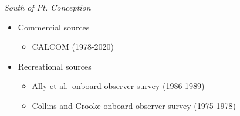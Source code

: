 \documentclass[11pt,
  english,
  a4paper,
]{article}
\begin{document}
\tagstructend

\emph{South of Pt. Conception}


\begin{itemize}
\item

  Commercial sources

  \tagmcend\tagstructend\tagstructend


  \begin{itemize}
  \item


    CALCOM (1978-2020)

    \tagmcend\tagstructend\tagstructend

    \tagmcend\tagstructend\tagstructend
  \end{itemize}

  \tagstructend
\item

  Recreational sources

  \tagmcend\tagstructend\tagstructend


  \begin{itemize}
  \item


    Ally et al.~onboard observer survey (1986-1989)

    \tagmcend\tagstructend\tagstructend

    \tagmcend\tagstructend\tagstructend
  \item


    Collins and Crooke onboard observer survey (1975-1978)

    \tagmcend\tagstructend\tagstructend


\end{itemize}
\end{itemize}
\end{document}
